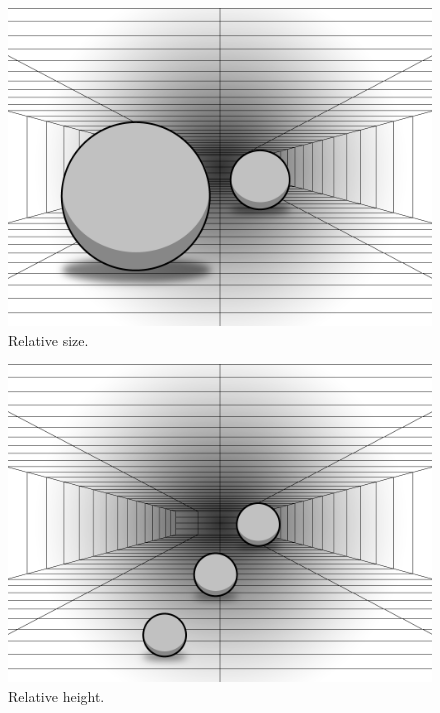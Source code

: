 \begin{figure}[H]
	\centering
	\includegraphics[width=1\linewidth]{figure/Analysis/relativeSize.png}
	\caption{Relative size.}
	\label{fig:relativeSize}
\end{figure}


\begin{figure}[H]
	\centering
	\includegraphics[width=1\linewidth]{figure/Analysis/relativeHeight.png}
	\caption{Relative height.}
	\label{fig:relativeHeight}
\end{figure}



